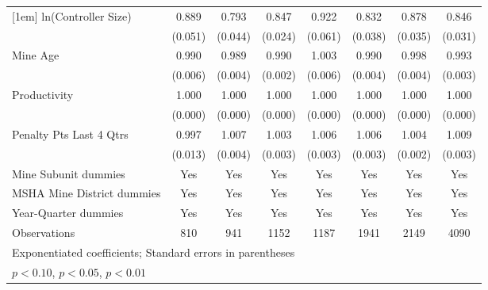 {\begin{tabular}{l*{7}{c}}
[1em]
ln(Controller Size)      &       0.889\sym{**} &       0.793\sym{***}&       0.847\sym{***}&       0.922         &       0.832\sym{***}&       0.878\sym{***}&       0.846\sym{***}\\
                         &     (0.051)         &     (0.044)         &     (0.024)         &     (0.061)         &     (0.038)         &     (0.035)         &     (0.031)         \\
[1em]
Mine Age                 &       0.990         &       0.989\sym{***}&       0.990\sym{***}&       1.003         &       0.990\sym{***}&       0.998         &       0.993\sym{***}\\
                         &     (0.006)         &     (0.004)         &     (0.002)         &     (0.006)         &     (0.004)         &     (0.004)         &     (0.003)         \\
[1em]
Productivity             &       1.000         &       1.000         &       1.000\sym{***}&       1.000         &       1.000         &       1.000\sym{**} &       1.000         \\
                         &     (0.000)         &     (0.000)         &     (0.000)         &     (0.000)         &     (0.000)         &     (0.000)         &     (0.000)         \\
[1em]
Penalty Pts Last 4 Qtrs  &       0.997         &       1.007\sym{*}  &       1.003         &       1.006\sym{**} &       1.006\sym{*}  &       1.004\sym{**} &       1.009\sym{***}\\
                         &     (0.013)         &     (0.004)         &     (0.003)         &     (0.003)         &     (0.003)         &     (0.002)         &     (0.003)         \\
[1em]
Mine Subunit dummies     &         Yes         &         Yes         &         Yes         &         Yes         &         Yes         &         Yes         &         Yes         \\
[1em]
MSHA Mine District dummies&         Yes         &         Yes         &         Yes         &         Yes         &         Yes         &         Yes         &         Yes         \\
[1em]
Year-Quarter dummies     &         Yes         &         Yes         &         Yes         &         Yes         &         Yes         &         Yes         &         Yes         \\
\hline
Observations             &         810         &         941         &        1152         &        1187         &        1941         &        2149         &        4090         \\
\hline\hline
\multicolumn{8}{l}{\footnotesize Exponentiated coefficients; Standard errors in parentheses}\\
\multicolumn{8}{l}{\footnotesize \sym{*} \(p<0.10\), \sym{**} \(p<0.05\), \sym{***} \(p<0.01\)}\\
\end{tabular}
}
